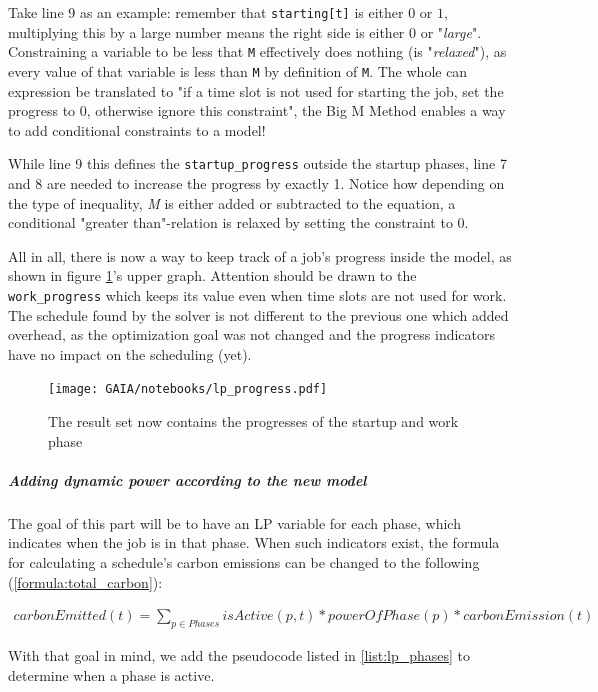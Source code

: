 Take line 9 as an example: 
remember that \verb|starting[t]| is either $0$ or $1$, multiplying this by a large number means the right side is either $0$ or "\emph{large}". 
Constraining a variable to be less that \verb|M| effectively does nothing (is "\emph{relaxed}"), as every value of that variable is less than \verb|M| by definition of \verb|M|. 
The whole can expression be translated to "if a time slot is not used for starting the job, set the progress to 0, otherwise ignore this constraint", the Big M Method enables a way to add conditional constraints to a model!

While line 9 this defines the \verb|startup_progress| outside the startup phases, line 7 and 8 are needed to increase the progress by exactly 1. 
Notice how depending on the type of inequality, \emph{M} is either added or subtracted to the equation, a conditional "greater than"-relation is relaxed by setting the constraint to 0.

All in all, there is now a way to keep track of a job's progress inside the model, as shown in figure \ref{fig:lp_progress}'s upper graph. Attention should be drawn to the \verb|work_progress| which keeps its value even when time slots are not used for work. 
The schedule found by the solver is not different to the previous one which added overhead, as the optimization goal was not changed and the progress indicators have no impact on the scheduling (yet).

\begin{figure}
    \texttt{[image: GAIA/notebooks/lp\_progress.pdf]}
    \caption{The result set now contains the progresses of the startup and work phase}
    \label{fig:lp_progress}
\end{figure}

\subparagraph{Adding dynamic power according to the new model}

The goal of this part will be to have an LP variable for each phase, which indicates when the job is in that phase.
When such indicators exist, the formula for calculating a schedule's carbon emissions can be changed to the following (\ref{formula:total_carbon}):

\begin{align}
    \label{formula:total_carbon}
    carbonEmitted(t) = \sum_{p \in Phases} isActive(p, t) * powerOfPhase(p) * carbonEmission(t)
\end{align}

With that goal in mind, we add the pseudocode listed in \ref{list:lp_phases} to determine when a phase is active. 

